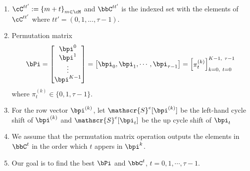\begin{enumerate}
\item $\cC^{tt'}:=\left\{m+t\right\}_{m \in \cM}$ and $\bbC^{tt'}$ is the indexed set with the elements of $\cC^{tt'}$ where  $tt'=(0,1,...,\tau-1)$. 
\item Permutation matrix 
\begin{equation*}
\bPi = \begin{bmatrix}
\bpi^0\cr
\bpi^1\cr
\vdots\cr
\bpi^{K-1}
\end{bmatrix}
= \begin{bmatrix}
\bpi_0 , \bpi_1,\cdots,\bpi_{\tau-1}
\end{bmatrix}
= \begin{bmatrix}
\pi_{t}^{(k)}
\end{bmatrix}_{k=0,~t=0}^{K-1,~\tau -1}
\end{equation*}
where $\pi_{t}^{(k)} \in \{0,1,\tau-1\}$. 

\item For the row vector $\bpi^{(k)}$, let $\mathscr{S}^e[\bpi^{(k)}]$ be the left-hand cycle shift of $\bpi^{(k)}$ and $\mathscr{S}^e[\bpi_t]$ be the up cycle shift of $\bpi_t$
\item We assume that the permutation matrix operation outputs the elements in $\bbC^t$ in the order which $t$ appers in $\bpi^k$. 
\item Our goal is to find the best $\bPi$ and $\bbC^t$, $t = 0,1,\cdots,\tau-1$. 
\end{enumerate}


